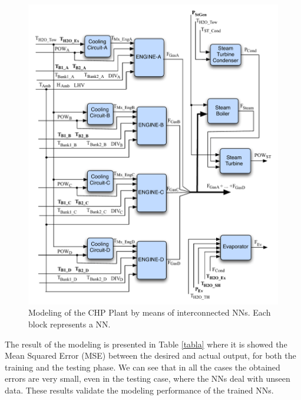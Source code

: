 \begin{figure}
\includegraphics[width=1\textwidth]{NNs.pdf}
\caption{Modeling of the CHP Plant by means of interconnected NNs. Each block represents a NN.}
\label{fignns}
\end{figure}


The result of the modeling is presented in Table \ref{tabla} where it is showed the Mean Squared Error (MSE) between the desired and actual output, for both the training and the testing phase. We can see that in all the cases the obtained  errors are very small, even in the testing case, where the NNs deal with unseen data. These results validate the modeling performance of the trained NNs. 


